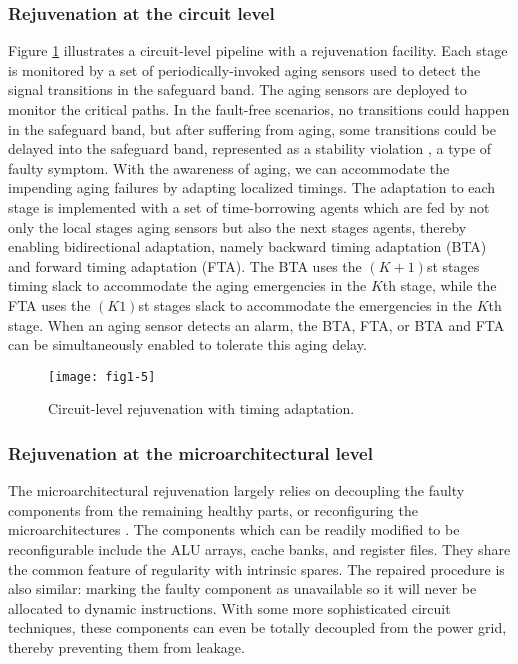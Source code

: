 \subsubsection{Rejuvenation at the circuit level}
Figure \ref{fig:circuit-repair} illustrates a circuit-level pipeline with a rejuvenation facility. Each stage is monitored by a set of periodically-invoked aging sensors used to detect the signal transitions in the safeguard band. The aging sensors are deployed to monitor the critical paths. In the fault-free scenarios, no transitions could happen in the safeguard band, but after suffering from aging, some transitions could be delayed into the safeguard band, represented as a stability violation \cite{yan2010svfd}, a type of faulty symptom. With the awareness of aging, we can accommodate the impending aging failures by adapting localized timings. The adaptation to each stage is implemented with a set of time-borrowing agents which are fed by not only the local stages aging sensors but also the next stages agents, thereby enabling bidirectional adaptation, namely backward timing adaptation (BTA) and forward timing adaptation (FTA). The BTA uses the $(K + 1)$st stages timing slack to accommodate the aging emergencies in the $K$th stage, while the FTA uses the $(K1)$st stages slack to accommodate the emergencies in the $K$th stage. When an aging sensor detects an alarm, the BTA, FTA, or BTA and FTA can be simultaneously enabled to tolerate this aging delay.

\begin{figure}[t]
\centering
\texttt{[image: fig1-5]}
\caption{Circuit-level rejuvenation with timing adaptation.}
\label{fig:circuit-repair} 
\end{figure}


\subsubsection{Rejuvenation at the microarchitectural level}
The microarchitectural rejuvenation largely relies on decoupling the faulty components from the remaining healthy parts, or reconfiguring the microarchitectures \cite{salvaging}. The components which can be readily modified to be reconfigurable include the ALU arrays, cache banks, and register files. They share the common feature of regularity with intrinsic spares. The repaired procedure is also similar: marking the faulty component as unavailable so it will never be allocated to dynamic instructions. With some more sophisticated circuit techniques, these components can even be totally decoupled from the power grid, thereby preventing them from leakage.

